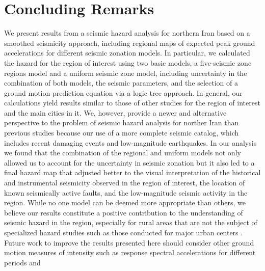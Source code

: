 
\section{Concluding Remarks}

We present results from a seismic hazard analysis for northern Iran based on a smoothed seismicity approach, including regional maps of expected peak ground accelerations for different seismic zonation models. In particular, we calculated the hazard for the region of interest using two basic models, a five-seismic zone regions model and a uniform seismic zone model, including uncertainty in the combination of both models, the seismic parameters, and the selection of a ground motion prediction equation via a logic tree approach. In general, our calculations yield results similar to those of other studies for the region of interest and the main cities in it. We, however, provide a newer and alternative perspective to the problem of seismic hazard analysis for norther Iran than previous studies because our use of a more complete seismic catalog, which includes recent damaging events and low-magnitude earthquakes. In our analysis we found that the combination of the regional and uniform models not only allowed us to account for the uncertainty in seismic zonation but it also led to a final hazard map that adjusted better to the visual interpretation of the historical and instrumental seismicity observed in the region of interest, the location of known seismically active faults, and the low-magnitude seismic activity in the region. While no one model can be deemed more appropriate than others, we believe our results constitute a positive contribution to the understanding of seismic hazard in the region, especially for rural areas that are not the subject of specialized hazard studies such as those conducted for major urban centers . Future work to  improve the results presented here should consider other ground motion measures of intensity such as response spectral accelerations for different periods and 
